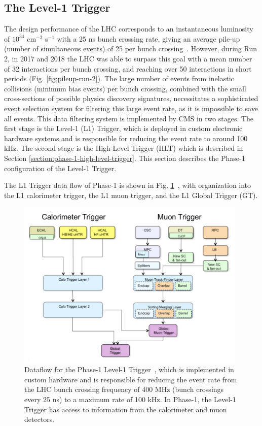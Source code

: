 \subsection{The Level-1 Trigger}
\label{section:phase-1-l1-trigger}
The design performance of the LHC corresponds to an instantaneous luminosity of $10^{34}$ cm$^{-2}$ s$^{-1}$ with a 25 ns bunch crossing rate, giving an average pile-up (number of simultaneous events) of 25 per bunch crossing~\cite{CMS-TDR-012}. However, during Run 2, in 2017 and 2018 the LHC was able to surpass this goal with a mean number of 32 interactions per bunch crossing, and reaching over 50 interactions in short periods (Fig. \ref{fig:pileup-run-2}). The large number of events from inelastic collisions (minimum bias events) per bunch crossing, combined with the small cross-sections of possible physics discovery signatures, necessitates a sophisticated event selection system for filtering this large event rate, as it is impossible to save all events. This data filtering system is implemented by CMS in two stages. The first stage is the Level-1 (L1) Trigger, which is deployed in custom electronic hardware systems and is responsible for reducing the event rate to around 100 kHz. The second stage is the High-Level Trigger (HLT) which is described in Section \ref{section:phase-1-high-level-trigger}. This section describes the Phase-1 configuration of the Level-1 Trigger.

The L1 Trigger data flow of Phase-1 is shown in Fig. \ref{fig:phase-1-level-1-trigger-dataflow}~\cite{CMS-TDR-012}, with organization into the L1 calorimeter trigger, the L1 muon trigger, and the L1 Global Trigger (GT). 

\begin{figure}[ht]
    \centering
    \includegraphics[width=11cm]{figures/ch-2-cern-cms/phase-1-level-1-trigger-dataflow.png}
    \caption[Dataflow for the Phase-1 Level-1 Trigger.]{Dataflow for the Phase-1 Level-1 Trigger~\cite{CMS-TDR-012}, which is implemented in custom hardware and is responsible for reducing the event rate from the LHC bunch crossing frequency of 400 MHz (bunch crossings every 25 ns) to a maximum rate of 100 kHz. In Phase-1, the Level-1 Trigger has access to information from the calorimeter and muon detectors.}
    \label{fig:phase-1-level-1-trigger-dataflow}
\end{figure}

